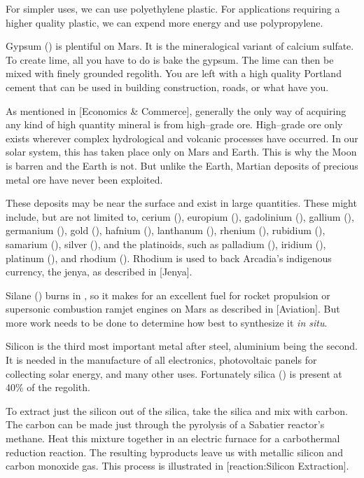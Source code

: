 For simpler uses, we can use polyethylene plastic. For applications requiring a higher quality plastic, we can expend more energy and use polypropylene.

Gypsum () is plentiful on Mars. It is the mineralogical variant of calcium sulfate. To create lime, all you have to do is bake the gypsum. The lime can then be mixed with finely grounded regolith. You are left with a high quality Portland cement that can be used in building construction, roads, or what have you.

As mentioned in [Economics & Commerce], generally the only way of acquiring any kind of high quantity mineral is from high--grade ore. High--grade ore only exists wherever complex hydrological and volcanic processes have occurred. In our solar system, this has taken place only on Mars and Earth. This is why the Moon is barren and the Earth is not. But unlike the Earth, Martian deposits of precious metal ore have never been exploited.

These deposits may be near the surface and exist in large quantities. These might include, but are not limited to, cerium (), europium (), gadolinium (), gallium (), germanium (), gold (), hafnium (), lanthanum (), rhenium (), rubidium (), samarium (), silver (), and the platinoids, such as palladium (), iridium (), platinum (), and rhodium (). Rhodium is used to back Arcadia's indigenous currency, the jenya, as described in [Jenya].

Silane () burns in , so it makes for an excellent fuel for rocket propulsion or supersonic combustion ramjet engines on Mars as described in [Aviation]. But more work needs to be done to determine how best to synthesize it {\it in situ}.

Silicon is the third most important metal after steel, aluminium being the second. It is needed in the manufacture of all electronics, photovoltaic panels for collecting solar energy, and many other uses. Fortunately silica () is present at 40\% of the regolith.

To extract just the silicon out of the silica, take the silica and mix with carbon. The carbon can be made just through the pyrolysis of a Sabatier reactor's methane. Heat this mixture together in an electric furnace for a carbothermal reduction reaction. The resulting byproducts leave us with metallic silicon and carbon monoxide gas. This process is illustrated in [reaction:Silicon Extraction]. 

